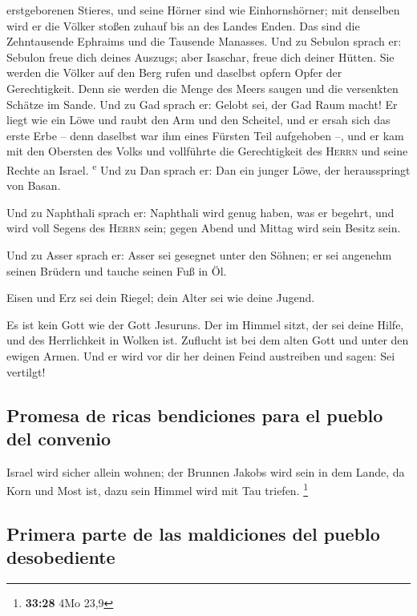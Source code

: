 erstgeborenen Stieres, und seine Hörner sind wie Einhornshörner; mit
denselben wird er die Völker stoßen zuhauf bis an des Landes Enden. Das
sind die Zehntausende Ephraims und die Tausende Manasses.
 Und zu Sebulon sprach er: Sebulon freue dich deines
Auszugs; aber Isaschar, freue dich deiner Hütten.  Sie
werden die Völker auf den Berg rufen und daselbst opfern Opfer der
Gerechtigkeit. Denn sie werden die Menge des Meers saugen und die
versenkten Schätze im Sande.  Und zu Gad sprach er:
Gelobt sei, der Gad Raum macht! Er liegt wie ein Löwe und raubt den Arm
und den Scheitel,  und er ersah sich das erste Erbe --
denn daselbst war ihm eines Fürsten Teil aufgehoben --, und er kam mit
den Obersten des Volks und vollführte die Gerechtigkeit des
\textsc{Herrn} und seine Rechte an Israel. \textsuperscript{e}
 Und zu Dan sprach er: Dan ein junger Löwe, der
herausspringt von Basan.

 Und zu Naphthali sprach er: Naphthali wird genug haben,
was er begehrt, und wird voll Segens des \textsc{Herrn} sein; gegen
Abend und Mittag wird sein Besitz sein.

 Und zu Asser sprach er: Asser sei gesegnet unter den
Söhnen; er sei angenehm seinen Brüdern und tauche seinen Fuß in Öl.

 Eisen und Erz sei dein Riegel; dein Alter sei wie deine
Jugend.

 Es ist kein Gott wie der Gott Jesuruns. Der im Himmel
sitzt, der sei deine Hilfe, und des Herrlichkeit in Wolken ist.
 Zuflucht ist bei dem alten Gott und unter den ewigen
Armen. Und er wird vor dir her deinen Feind austreiben und sagen: Sei
vertilgt!

\hypertarget{promesa-de-ricas-bendiciones-para-el-pueblo-del-convenio}{%
\subsection{Promesa de ricas bendiciones para el pueblo del
convenio}\label{promesa-de-ricas-bendiciones-para-el-pueblo-del-convenio}}

 Israel wird sicher allein wohnen; der Brunnen Jakobs
wird sein in dem Lande, da Korn und Most ist, dazu sein Himmel wird mit
Tau triefen. \footnote{\textbf{33:28} 4Mo 23,9}

\hypertarget{primera-parte-de-las-maldiciones-del-pueblo-desobediente}{%
\subsection{Primera parte de las maldiciones del pueblo
desobediente}\label{primera-parte-de-las-maldiciones-del-pueblo-desobediente}}

